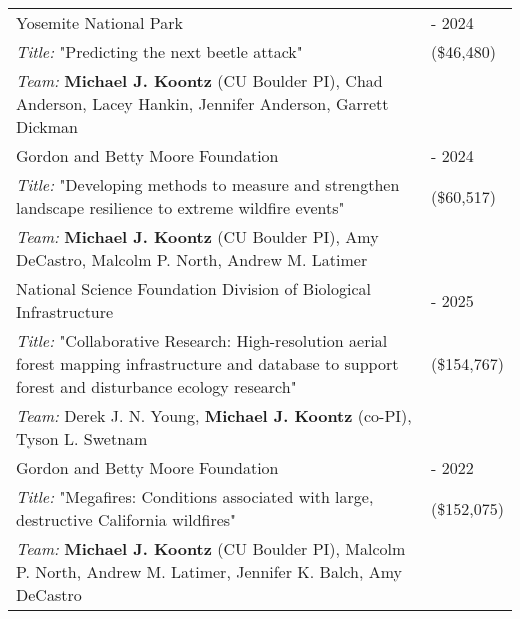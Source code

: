 \begin{longtable}{@{}>{\raggedright}p{5.25in} @{} >{\raggedleft}X@{}}


Yosemite National Park & 2023 - 2024 \tabularnewline
\addtolength{\leftskip}{5ex}\emph{Title:} "Predicting the next beetle attack" & (\$46,480) \tabularnewline
\addtolength{\leftskip}{5ex}\emph{Team:} \textbf{Michael J. Koontz} (CU Boulder PI), Chad Anderson, Lacey Hankin, Jennifer Anderson, Garrett Dickman & \tabularnewline

Gordon and Betty Moore Foundation & 2023 - 2024 \tabularnewline
\addtolength{\leftskip}{5ex}\emph{Title:} "Developing methods to measure and strengthen landscape resilience to extreme wildfire events" & (\$60,517) \tabularnewline
\addtolength{\leftskip}{5ex}\emph{Team:} \textbf{Michael J. Koontz} (CU Boulder PI), Amy DeCastro, Malcolm P. North, Andrew M. Latimer & \tabularnewline


National Science Foundation Division of Biological Infrastructure & 2022 - 2025 \tabularnewline
\addtolength{\leftskip}{5ex}\emph{Title:} "Collaborative Research: High-resolution aerial forest mapping infrastructure and database to support forest and disturbance ecology research" & (\$154,767) \tabularnewline
\addtolength{\leftskip}{5ex}\emph{Team:} Derek J. N. Young, \textbf{Michael J. Koontz} (co-PI), Tyson L. Swetnam & \tabularnewline

Gordon and Betty Moore Foundation & 2020 - 2022 \tabularnewline
\addtolength{\leftskip}{5ex}\emph{Title:} "Megafires: Conditions associated with large, destructive California wildfires" & (\$152,075) \tabularnewline
\addtolength{\leftskip}{5ex}\emph{Team:} \textbf{Michael J. Koontz} (CU Boulder PI), Malcolm P. North, Andrew M. Latimer, Jennifer K. Balch, Amy DeCastro & \tabularnewline


\end{longtable}
